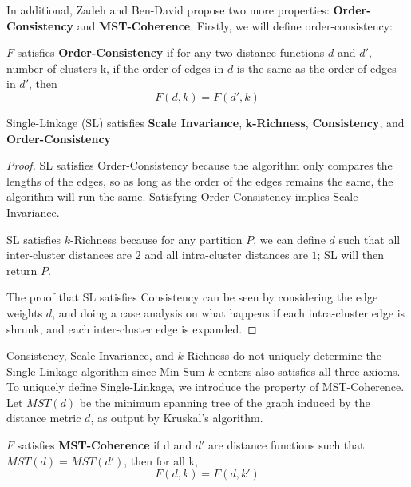 \medskip

In additional, Zadeh and Ben-David propose two more properties: \textbf{Order-Consistency} and \textbf{MST-Coherence}. Firstly, we will define order-consistency:

\begin{definition}
    $F$ satisfies \textbf{Order-Consistency} if for any two distance functions $d$ and $d'$, number of clusters k, if the order of edges in $d$ is the same as the order of edges in $d'$, then 
    $$
    F(d, k) = F(d', k)
    $$
\end{definition}


\begin{theorem}
    Single-Linkage (SL) satisfies \textbf{Scale Invariance}, \textbf{k-Richness}, \textbf{Consistency}, and \textbf{Order-Consistency}
\end{theorem}

\begin{proof}
    
    SL satisfies Order-Consistency because the algorithm only compares the lengths of the edges, so as long as the order of the edges remains the same, the algorithm will run the same. Satisfying Order-Consistency implies Scale Invariance.
    
    SL satisfies $k$-Richness because for any partition $P$, we can define $d$ such that all inter-cluster distances are $2$ and all intra-cluster distances are $1$; SL will then return $P$.
    
    The proof that SL satisfies Consistency can be seen by considering the edge weights $d$, and doing a case analysis on what happens if each intra-cluster edge is shrunk, and each inter-cluster edge is expanded.
    
\end{proof}

Consistency, Scale Invariance, and $k$-Richness do not uniquely determine the
Single-Linkage algorithm since Min-Sum $k$-centers also satisfies all three axioms. To uniquely define Single-Linkage, we introduce the property of MST-Coherence. Let $MST(d)$ be the minimum spanning tree of the graph induced by the distance metric $d$, as output by Kruskal's algorithm.

\begin{definition} $F$ satisfies \textbf{MST-Coherence} if d and $d'$ are distance functions such that $MST(d) = MST(d')$, then for all k, 
    $$
    F(d, k) = F(d, k')
    $$
\end{definition}

